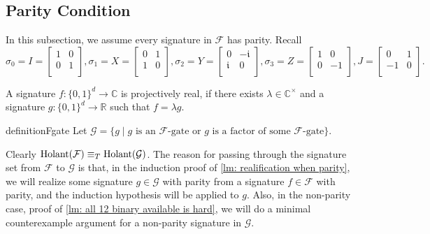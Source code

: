 \subsection{Parity Condition}\label{subsec: f6 parity}
In this subsection, we assume every signature in $\mathcal{F}$ has parity.
Recall
$$
\sigma_0=I=\left[\begin{matrix}
    1 & 0\\
    0 & 1\\
\end{matrix}\right],
\sigma_1=X=\left[\begin{matrix}
    0 & 1\\
    1 & 0\\
\end{matrix}\right],
\sigma_2=Y=\left[\begin{matrix}
    0 & -\mathfrak i\\
    \mathfrak i & 0\\
\end{matrix}\right],
\sigma_3=Z=\left[\begin{matrix}
    1 & 0\\
    0 & -1\\
\end{matrix}\right],
J=\left[\begin{matrix}
    0 & 1\\
    -1 & 0\\
\end{matrix}\right].
$$



\begin{definition}
    A signature $f:\{0,1\}^d\to \mathbb{C}$ is projectively real, if there exists $\lambda\in \mathbb{C}^{\times}$ and a signature $g:\{0,1\}^d\to \mathbb{R}$ such that $f=\lambda g.$
\end{definition}

\begin{restatable}{definition}{Fgate}
    Let $\mathcal{G}=\{g\mid g \text{  is an $\mathcal{F}$-gate or $g$ is a factor of some $\mathcal{F}$-gate}\}.$
\end{restatable}

Clearly $\operatorname{Holant}(\mathcal{F})\equiv_T \operatorname{Holant}(\mathcal{G})$.
The reason for passing through the signature set from $\mathcal{F}$ to $\mathcal{G}$ is that, in the induction proof of \cref{lm: realification when parity}, we will realize some signature $g\in \mathcal{G}$ with parity from a signature $f\in \mathcal{F}$ with parity, and the induction hypothesis will be applied to $g.$
Also, in the non-parity case, proof of \cref{lm: all 12 binary available is hard}, we will do a minimal counterexample argument for a non-parity signature in $\mathcal{G}.$


